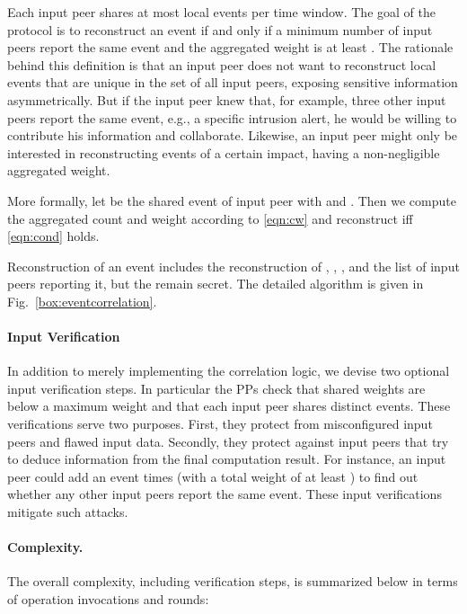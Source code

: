 \documentclass[letterpaper,11pt,onecolumn,titlepage]{article}
\begin{document}
Each input peer shares at most  local events per time window. The goal of the protocol is to reconstruct an event if and only if a minimum number of input peers  report the same event and the aggregated weight is at least . The rationale behind this definition is that an input peer does not want to reconstruct local events that are unique in the set of all input peers, exposing sensitive information asymmetrically. But if
the input peer knew that, for example, three other input peers report the same event, e.g., a specific intrusion alert, he would be willing to contribute his information
and collaborate. Likewise, an input peer might only be interested in reconstructing events of a certain impact, having a non-negligible aggregated weight. 


More formally, let  be the shared event  of input peer  with  and . Then we compute the aggregated count  and weight  according to \eqref{eqn:cw} and reconstruct  iff \eqref{eqn:cond} holds.





Reconstruction of an event  includes the reconstruction of , , , and the list of input peers reporting it, but the  remain secret. The detailed algorithm is given in Fig.~\ref{box:eventcorrelation}.

\paragraph{Input Verification} 

In addition to merely implementing the correlation logic, we devise two optional input verification steps. In particular the PPs check that shared weights are below a maximum weight  and that each input peer shares distinct events. These verifications serve two purposes. First, they protect from misconfigured input peers and flawed input data. Secondly, they protect against input peers that try to deduce information from the final computation result. For instance, 
an input peer could add an event  times (with a total weight of at least ) to find out whether any other input peers report the same event. These input verifications mitigate such attacks.

\paragraph{Complexity.} The overall complexity, including verification steps, is summarized below in terms of operation invocations and rounds:
\end{document}
